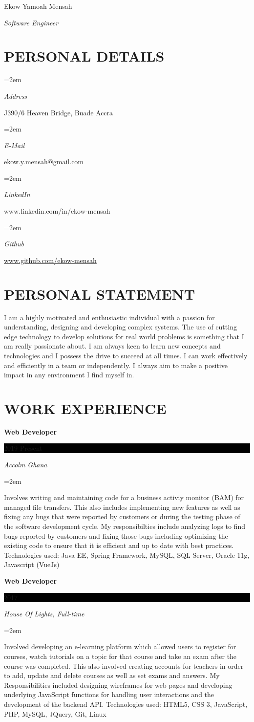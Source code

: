 \documentclass[paper=a4,fontsize=11pt]{scrartcl} %
\newlength{\spacebox}
\newcommand{\sepspace}{\vspace*{1em}}       %
\newcommand{\MyName}[1]{ %
        \Huge \usefont{OT1}{phv}{b}{n} \hfill #1
        \par \normalsize \normalfont}
\newcommand{\MySlogan}[1]{ %
        \large \usefont{OT1}{phv}{m}{n}\hfill \textit{#1}
        \par \normalsize \normalfont}
\newcommand{\NewPart}[1]{\section*{\uppercase{#1}}}
\newcommand{\PersonalEntry}[2]{
        \noindent\hangindent=2em\hangafter=0 %
        \parbox{\spacebox}{        %
        \textit{#1}}               %
        \hspace{1.5em} #2 \par}    %
\newcommand{\EducationEntry}[4]{
        \noindent \textbf{#1} \hfill      %
        \colorbox{Black}{%
            \parbox{6em}{%
            \hfill\color{White}#2}} \par  %
        \noindent \textit{#3} \par        %
        \noindent\hangindent=2em\hangafter=0 \small #4 %
        \normalsize \par}
\begin{document}

\MyName{Ekow Yamoah Mensah}
\MySlogan{Software Engineer}

\sepspace

\NewPart{Personal details}{}

\PersonalEntry{Address}{J390/6 Heaven Bridge, Buade Accra}
\PersonalEntry{E-Mail}{ekow.y.mensah@gmail.com}
\PersonalEntry{LinkedIn}{www.linkedin.com/in/ekow-mensah}
\PersonalEntry{Github}{\url{www.github.com/ekow-mensah}}

\NewPart{Personal Statement}{} 
I am a highly motivated and enthusiastic individual with a passion for understanding, designing and developing complex systems. The use of cutting edge technology to develop solutions for real world problems is something that I am really
passionate about. I am always keen to learn new concepts and technologies and I possess the drive to succeed at all times. I can work effectively
and efficiently in a team or independently. I always aim to make a positive impact in any
environment I find myself in.

\NewPart{Work experience}{}

\EducationEntry{Web Developer}{2019-Present}{Accolm Ghana}{}{\noindent \small Involves writing and maintaining code for a business activiy monitor (BAM) for managed file transfers. This also includes implementing new features as well as fixing any bugs that were reported by customers or during the testing phase of the software development cycle. My responsibilties include analyzing logs to find bugs reported by customers and fixing those bugs including optimizing the existing code to ensure that it is efficient and up to date with best practices.   \newline 
Technologies used: Java EE, Spring Framework, MySQL, SQL Server, Oracle 11g, Javascript (VueJs) }
\sepspace

\EducationEntry{Web Developer}{2017}{House Of Lights, Full-time}{}{\noindent \small Involved developing an e-learning platform which allowed users to register for courses, watch
	tutorials on a topic for that course and take an exam after the course was completed. This also
	involved creating accounts for teachers in order to add, update and delete courses as well as
	set exams and answers. My Responsibilities included designing wireframes for web pages and
	developing underlying JavaScript functions for handling user interactions and the development of
	the backend API.
	\newline
	Technologies used: HTML5, CSS 3, JavaScript, PHP, MySQL, JQuery, Git, Linux }
\sepspace
\end{document}

